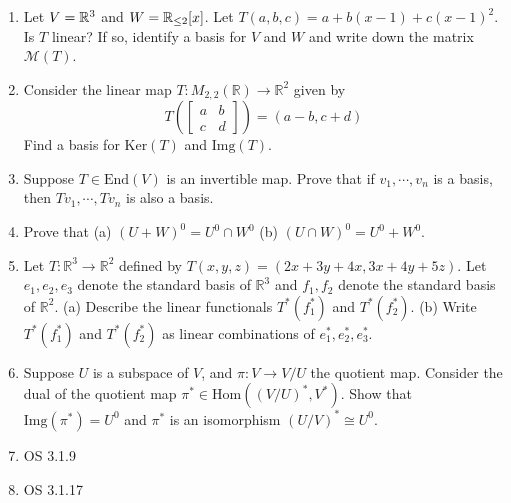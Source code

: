 \documentclass{amsart}
\begin{document}
	\begin{enumerate}
		\item 	Let $V=\mathbb{R}^3$ and $W = \mathbb{R}_{\leq 2}[x]$. Let $T(a,b,c)=a+b(x-1)+c(x-1)^2$. Is $T$ linear? If so, identify a basis for $V$ and $W$ and write down the matrix $\mathcal{M}(T)$.
		\item Consider the linear map $T:M_{2,2}(\mathbb{R})\to \mathbb{R}^2$ given by
		\[T\left(\begin{bmatrix}
			a&b\\c&d
		\end{bmatrix}\right)=(a-b,c+d)\] 
		Find a basis for $\text{Ker}(T)$ and $\text{Img}(T)$.
		\item Suppose $T\in \text{End}(V)$ is an invertible map. Prove that if $v_1,\cdots,v_n$ is a basis, then $Tv_1,\cdots,Tv_n$ is also a basis.
		\item Prove that (a) $(U+W)^0=U^0\cap W^0 $ (b) $(U\cap W)^0=U^0+W^0$.
		\item Let $T:\mathbb{R}^3\to \mathbb{R}^2$ defined by
$T(x,y,z) = (2x+3y+4x,3x+4y+5z)$. Let $e_1,e_2,e_3$ denote the standard basis of $\mathbb{R}^3$ and $f_1,f_2$ denote the standard basis of $\mathbb{R}^2$.
(a) Describe the linear functionals $T^*(f_1^*)$ and $T^*(f_2^*)$.
(b) Write $T^*(f_1^*)$ and $T^*(f_2^*)$ as linear combinations of $e_1^*,e_2^*,e_3^*$.
\item Suppose $U$ is a subspace of $V$, and $\pi:V\to V/U$ the quotient map. Consider the dual of the quotient map $\pi^*\in \text{Hom}((V/U)^*,V^*)$. Show that $\text{Img}(\pi^*)=U^0$ and $\pi^*$ is an isomorphism $(U/V)^*\cong U^0$.
\item {OS 3.1.9}
		\item {OS 3.1.17} 
	 	\end{enumerate}
	 	
	
\end{document}
